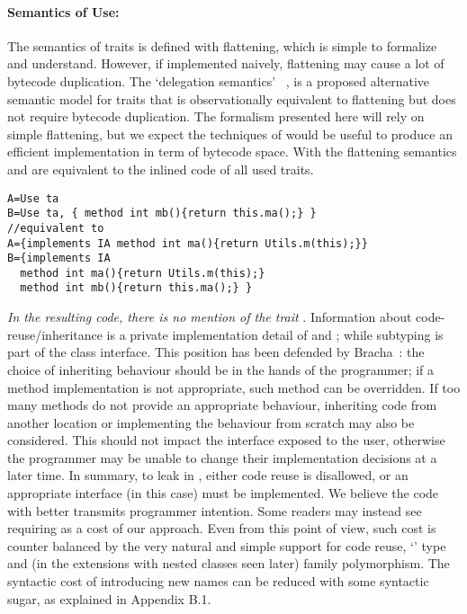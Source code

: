 \paragraph{Semantics of Use:}
The semantics of traits is defined with flattening, which is 
simple to formalize and understand.
However, if implemented naively, flattening may cause a lot of
bytecode duplication.
The `delegation semantics'%
~\cite{lagorio2009featherweight},
is a proposed alternative semantic model for traits
that is observationally equivalent to flattening but does not require
bytecode duplication. The formalism presented here will rely on simple
flattening, but we expect the techniques of
\cite{lagorio2009featherweight} would be useful to produce an
efficient implementation in term of bytecode space. 
With the flattening semantics
 \Q@A@ and \Q@B@ are equivalent to the inlined code of all used traits{.}%
\saveSpace\saveSpace\begin{lstlisting}
A=Use ta
B=Use ta, { method int mb(){return this.ma();} }
//equivalent to
A={implements IA method int ma(){return Utils.m(this);}}
B={implements IA
  method int ma(){return Utils.m(this);}
  method int mb(){return this.ma();} } 
 \end{lstlisting}
\saveSpace\saveSpace
\emph{In the resulting code, there is no mention of the trait
 \Q@ta@}. Information about code-reuse/inheritance
  is a private implementation detail of \Q@A@
 and \Q@B@; while subtyping is part of the class interface.%
This position has been defended by 
Bracha~\cite{bracha1992programming}:
the choice of inheriting behaviour %
should be in the hands of the programmer; if a method implementation is not appropriate, such method can be
overridden. If too many methods do not provide an appropriate behaviour, inheriting code from another location or implementing the behaviour from scratch may also be considered.
This should not impact the interface exposed to the user, otherwise the programmer may be unable to change their implementation decisions at a later time.
%
In summary, to leak \Q@this@ in \name, either code reuse is disallowed, or an appropriate interface (\Q@IA@ in this case) must be implemented.
We believe the code with \Q@IA@ better transmits programmer intention. Some
readers may instead see requiring \Q@IA@ as a cost of our approach.
Even from this point of view, such cost is counter balanced by 
the very natural and simple support for code reuse, `\Q@This@' type and (in the extensions with nested classes seen later)
family polymorphism.
The syntactic cost of introducing new names can be reduced
with some syntactic sugar, as explained in Appendix B.1.






